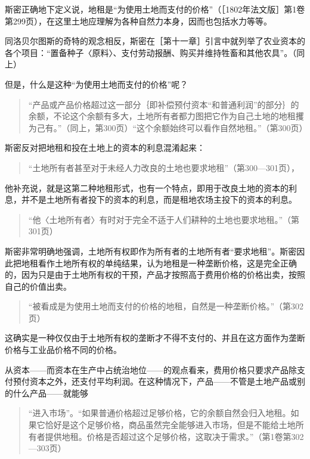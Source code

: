 斯密正确地下定义说，地租是“为使用土地而支付的价格”（［1802年法文版］第1卷第299页），在这里土地应理解为各种自然力本身，因而也包括水力等等。

同洛贝尔图斯的奇特的观念相反，斯密在［第十一章］引言中就列举了农业资本的各个项目：“置备种子〈原料〉、支付劳动报酬、购买并维持牲畜和其他农具”。（同上）

但是，什么是这种“为使用土地而支付的价格”呢？

\begin{quote}{“产品或产品价格超过这一部分｛即补偿预付资本“和普通利润”的部分｝的余额，不论这个余额有多大，土地所有者都力图把它作为自己土地的地租攫为己有。”（同上，第300页）“这个余额始终可以看作自然地租。”（第300页）}\end{quote}

斯密反对把地租和投在土地上的资本的利息混淆起来：

\begin{quote}{“土地所有者甚至对于未经人力改良的土地也要求地租”（第300—301页），}\end{quote}

他补充说，就是这第二种地租形式，也有一个特点，即用于改良土地的资本的利息，并不是土地所有者投下的资本的利息，而是租地农场主投下的资本的利息。

\begin{quote}{“他〈土地所有者〉有时对于完全不适于人们耕种的土地也要求地租。”（第301页）}\end{quote}

斯密非常明确地强调，土地所有权即作为所有者的土地所有者“要求地租”。斯密因此把地租看作土地所有权的单纯结果，认为地租是一种垄断价格，这是完全正确的，因为只是由于土地所有权的干预，产品才按照高于费用价格的价格出卖，按照自己的价值出卖。

\begin{quote}{“被看成是为使用土地而支付的价格的地租，自然是一种垄断价格。”（第302页）}\end{quote}

这确实是一种仅仅由于土地所有权的垄断才不得不支付的、并且在这方面作为垄断价格与工业品价格不同的价格。

从资本——而资本在生产中占统治地位——的观点看来，费用价格只要求产品除支付预付资本之外，还支付平均利润。在这种情况下，产品——不管是土地产品或别的什么产品——就能够

\begin{quote}{“进入市场”。“如果普通价格超过足够价格，它的余额自然会归入地租。如果它恰好是这个足够价格，商品虽然完全能够进入市场，但是不能给土地所有者提供地租。价格是否超过这个足够价格，这取决于需求。”（第1卷第302—303页）}\end{quote}


